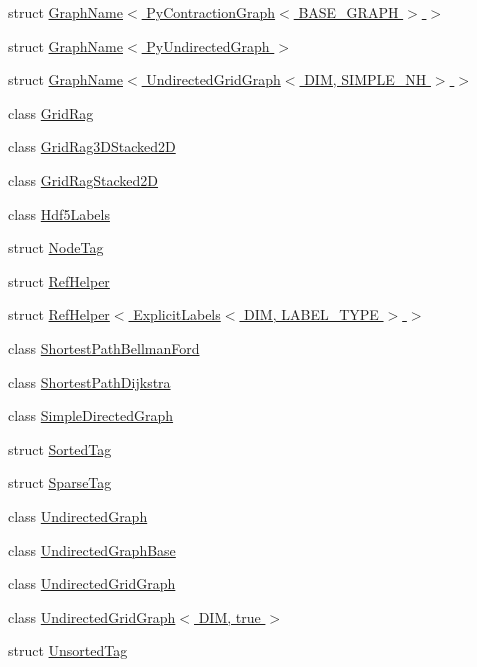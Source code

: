 \begin{DoxyCompactItemize}
\item 
struct \hyperlink{structnifty_1_1graph_1_1GraphName_3_01PyContractionGraph_3_01BASE__GRAPH_01_4_01_4}{Graph\+Name$<$ Py\+Contraction\+Graph$<$ B\+A\+S\+E\+\_\+\+G\+R\+A\+P\+H $>$ $>$}
\item 
struct \hyperlink{structnifty_1_1graph_1_1GraphName_3_01PyUndirectedGraph_01_4}{Graph\+Name$<$ Py\+Undirected\+Graph $>$}
\item 
struct \hyperlink{structnifty_1_1graph_1_1GraphName_3_01UndirectedGridGraph_3_01DIM_00_01SIMPLE__NH_01_4_01_4}{Graph\+Name$<$ Undirected\+Grid\+Graph$<$ D\+I\+M, S\+I\+M\+P\+L\+E\+\_\+\+N\+H $>$ $>$}
\item 
class \hyperlink{classnifty_1_1graph_1_1GridRag}{Grid\+Rag}
\item 
class \hyperlink{classnifty_1_1graph_1_1GridRag3DStacked2D}{Grid\+Rag3\+D\+Stacked2\+D}
\item 
class \hyperlink{classnifty_1_1graph_1_1GridRagStacked2D}{Grid\+Rag\+Stacked2\+D}
\item 
class \hyperlink{classnifty_1_1graph_1_1Hdf5Labels}{Hdf5\+Labels}
\item 
struct \hyperlink{structnifty_1_1graph_1_1NodeTag}{Node\+Tag}
\item 
struct \hyperlink{structnifty_1_1graph_1_1RefHelper}{Ref\+Helper}
\item 
struct \hyperlink{structnifty_1_1graph_1_1RefHelper_3_01ExplicitLabels_3_01DIM_00_01LABEL__TYPE_01_4_01_4}{Ref\+Helper$<$ Explicit\+Labels$<$ D\+I\+M, L\+A\+B\+E\+L\+\_\+\+T\+Y\+P\+E $>$ $>$}
\item 
class \hyperlink{classnifty_1_1graph_1_1ShortestPathBellmanFord}{Shortest\+Path\+Bellman\+Ford}
\item 
class \hyperlink{classnifty_1_1graph_1_1ShortestPathDijkstra}{Shortest\+Path\+Dijkstra}
\item 
class \hyperlink{classnifty_1_1graph_1_1SimpleDirectedGraph}{Simple\+Directed\+Graph}
\item 
struct \hyperlink{structnifty_1_1graph_1_1SortedTag}{Sorted\+Tag}
\item 
struct \hyperlink{structnifty_1_1graph_1_1SparseTag}{Sparse\+Tag}
\item 
class \hyperlink{classnifty_1_1graph_1_1UndirectedGraph}{Undirected\+Graph}
\item 
class \hyperlink{classnifty_1_1graph_1_1UndirectedGraphBase}{Undirected\+Graph\+Base}
\item 
class \hyperlink{classnifty_1_1graph_1_1UndirectedGridGraph}{Undirected\+Grid\+Graph}
\item 
class \hyperlink{classnifty_1_1graph_1_1UndirectedGridGraph_3_01DIM_00_01true_01_4}{Undirected\+Grid\+Graph$<$ D\+I\+M, true $>$}
\item 
struct \hyperlink{structnifty_1_1graph_1_1UnsortedTag}{Unsorted\+Tag}
\end{DoxyCompactItemize}
